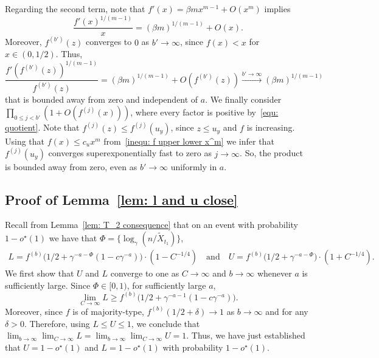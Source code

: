 \documentclass[11pt]{article}
\numberwithin{theorem}{section}
\begin{document}
Regarding the second term, note that $f'(x)=\beta m x^{m-1}+O(x^m)$ implies 
\[
\frac{f'(x)^{1/(m-1)}}{x}=(\beta m)^{1/(m-1)}+O(x).
\]
Moreover, $f^{(b')}(z)$ converges to $0$ as $b'\to\infty$, since $f(x)<x$ for $x\in(0,1/2)$. Thus,
\[
    \frac{f'(f^{(b')}(z))^{1/(m-1)}}{f^{(b')}(z)}
    = (\beta m)^{1/(m-1)} +O(f^{(b')}(z)) \overset{b'\to\infty}{\longrightarrow}(\beta m)^{1/(m-1)}
\]
that is bounded away from zero and independent of $a$.
We finally consider $\prod_{0\leq j< b'}(1+O(f^{(j)}(x)))$, where every factor is positive by~\eqref{equ: quotient}.
Note that
$f^{(j)}(z)\leq f^{(j)}(u_y)$, since $z\leq u_y$ and $f$ is increasing. Using that $f(x) \le c_u x^m$ from~\eqref{inequ: f upper lower x^m} we infer that $f^{(j)}(u_y)$ converges superexponentially fast to zero as $j\to\infty$. So, the product is bounded away from zero, even as $b'\to\infty$ uniformly in $a$. 


\subsection{Proof of Lemma~\ref{lem: l and u close}}\label{subsec: Other proofs}

Recall from Lemma~\ref{lem: T_2 consequence} that on an event with probability $1-o^\star(1)$ we have that $\Phi =  \{\log_\gamma(n/\tilde X_{t_1})\}$,
\begin{align*}
    L = f^{(b)}\big(1/2+\gamma^{-a-\Phi}(1-c\gamma^{-a})\big) \cdot (1-C^{-1/4})
    \quad
    \text{and}    
    \quad
    U= f^{(b)}\big(1/2+\gamma^{-a-\Phi}\big)\cdot(1+C^{-1/4}).
\end{align*}
We first show that $U$ and $L$ converge to one as $C\to \infty$ and $b\to \infty$ whenever $a$ is sufficiently large. 
Since $\Phi\in[0,1)$, for sufficiently large $a$,
\[
\lim_{C\to\infty} L \geq  f^{(b)}\big(1/2+\gamma^{-a-1}(1-c\gamma^{-a})\big).
\]
Moreover, since $f$ is of majority-type, $f^{(b)}(1/2+\delta)\to1$ as $b\to \infty$ and for any $\delta >0$. Therefore, using $L \leq U \leq 1$, we conclude that
$
\lim_{b\to \infty}\lim_{C\to \infty} L = \lim_{b\to \infty}\lim_{C\to \infty} U =1.
$
Thus, we have just established that $U=1-o^\star(1)$ and $L=1-o^\star(1)$ with probability $1-o^\star(1)$.
\end{document}
